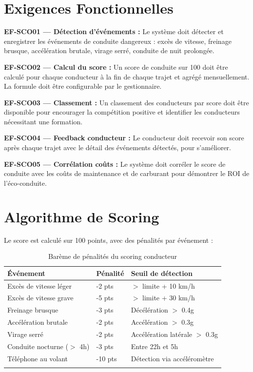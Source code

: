 \documentclass[12pt,a4paper]{report}
\begin{document}
\section{Exigences Fonctionnelles}

\begin{reqbox}
\textbf{EF-SCO01 — Détection d'événements :} Le système doit détecter et enregistrer les événements de conduite dangereux : excès de vitesse, freinage brusque, accélération brutale, virage serré, conduite de nuit prolongée.
\end{reqbox}

\begin{reqbox}
\textbf{EF-SCO02 — Calcul du score :} Un score de conduite sur 100 doit être calculé pour chaque conducteur à la fin de chaque trajet et agrégé mensuellement. La formule doit être configurable par le gestionnaire.
\end{reqbox}

\begin{reqbox}
\textbf{EF-SCO03 — Classement :} Un classement des conducteurs par score doit être disponible pour encourager la compétition positive et identifier les conducteurs nécessitant une formation.
\end{reqbox}

\begin{reqbox}
\textbf{EF-SCO04 — Feedback conducteur :} Le conducteur doit recevoir son score après chaque trajet avec le détail des événements détectés, pour s'améliorer.
\end{reqbox}

\begin{reqbox}
\textbf{EF-SCO05 — Corrélation coûts :} Le système doit corréler le score de conduite avec les coûts de maintenance et de carburant pour démontrer le ROI de l'éco-conduite.
\end{reqbox}

\section{Algorithme de Scoring}

Le score est calculé sur 100 points, avec des pénalités par événement :

\begin{longtable}{p{5cm}p{3cm}p{5cm}}
\toprule
\textbf{Événement} & \textbf{Pénalité} & \textbf{Seuil de détection} \\
\midrule
\endhead
Excès de vitesse léger & -2 pts & $>$ limite + 10 km/h \\
Excès de vitesse grave & -5 pts & $>$ limite + 30 km/h \\
Freinage brusque & -3 pts & Décélération $>$ 0.4g \\
Accélération brutale & -2 pts & Accélération $>$ 0.3g \\
Virage serré & -2 pts & Accélération latérale $>$ 0.3g \\
Conduite nocturne ($>$ 4h) & -3 pts & Entre 22h et 5h \\
Téléphone au volant & -10 pts & Détection via accéléromètre \\
\bottomrule
\caption{Barème de pénalités du scoring conducteur}
\end{longtable}
\end{document}
